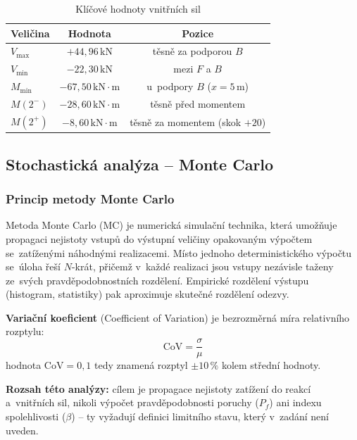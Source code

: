 \documentclass[a4paper,11pt]{article}
\newcommand{\unit}[1]{\,\mathrm{#1}}
\begin{document}
\begin{table}[H]
\centering
\caption{Klíčové hodnoty vnitřních sil}
\label{tab:1E_klicove}
\begin{tabular}{lcc}
\toprule
\textbf{Veličina} & \textbf{Hodnota} & \textbf{Pozice} \\
\midrule
$V_{\max}$ & $+44{,}96\unit{kN}$ & těsně za podporou $B$ \\
$V_{\min}$ & $-22{,}30\unit{kN}$ & mezi $F$ a $B$ \\
$M_{\min}$ & $-67{,}50\unit{kN \cdot m}$ & u~podpory $B$ ($x=5\unit{m}$) \\
$M(2^-)$ & $-28{,}60\unit{kN \cdot m}$ & těsně před momentem \\
$M(2^+)$ & $-8{,}60\unit{kN \cdot m}$ & těsně za momentem (skok $+20$) \\
\bottomrule
\end{tabular}
\end{table}

\subsection{Stochastická analýza -- Monte Carlo}

\subsubsection{Princip metody Monte Carlo}

Metoda Monte Carlo (MC) je numerická simulační technika, která umožňuje propagaci nejistoty vstupů do výstupní veličiny opakovaným výpočtem se~zatíženými náhodnými realizacemi. Místo jednoho deterministického výpočtu se~úloha řeší $N$-krát, přičemž v~každé realizaci jsou vstupy nezávisle taženy ze~svých pravděpodobnostních rozdělení. Empirické rozdělení výstupu (histogram, statistiky) pak aproximuje skutečné rozdělení odezvy.

\medskip\noindent
\textbf{Variační koeficient} (Coefficient of Variation) je bezrozměrná míra relativního rozptylu:
\begin{equation}
    \mathrm{CoV} = \frac{\sigma}{\mu}
\end{equation}
hodnota $\mathrm{CoV} = 0{,}1$ tedy znamená rozptyl $\pm 10\,\%$ kolem střední hodnoty.

\medskip\noindent
\textbf{Rozsah této analýzy:} cílem je propagace nejistoty zatížení do reakcí a~vnitřních sil, nikoli výpočet pravděpodobnosti poruchy ($P_f$) ani indexu spolehlivosti ($\beta$) -- ty vyžadují definici limitního stavu, který v~zadání není uveden.
\end{document}
